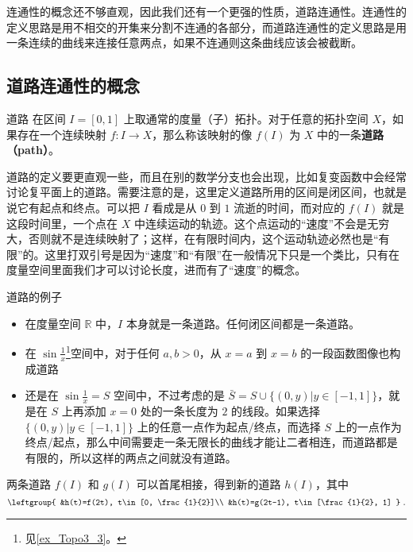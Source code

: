 
连通性的概念还不够直观，因此我们还有一个更强的性质，道路连通性。连通性的定义思路是用不相交的开集来分割不连通的各部分，而道路连通性的定义思路是用一条连续的曲线来连接任意两点，如果不连通则这条曲线应该会被截断。

\subsection{道路连通性的概念}
\begin{definition}{道路}\label{def_Topo4_1}
在区间 $I=[0,1]$ 上取通常的度量（子）拓扑。对于任意的拓扑空间 $X$，如果存在一个连续映射 $f: I\rightarrow X$，那么称该映射的像 $f(I)$ 为 $X$ 中的一条\textbf{道路（path）}。
\end{definition}

道路的定义要更直观一些，而且在别的数学分支也会出现，比如复变函数中会经常讨论复平面上的道路。需要注意的是，这里定义道路所用的区间是闭区间，也就是说它有起点和终点。可以把 $I$ 看成是从 $0$ 到 $1$ 流逝的时间，而对应的 $f(I)$ 就是这段时间里，一个点在 $X$ 中连续运动的轨迹。这个点运动的“速度”不会是无穷大，否则就不是连续映射了；这样，在有限时间内，这个运动轨迹必然也是“有限”的。这里打双引号是因为“速度”和“有限”在一般情况下只是一个类比，只有在度量空间里面我们才可以讨论长度，进而有了“速度”的概念。

\begin{example}{道路的例子}\label{ex_Topo4_1}
\begin{itemize}
\item 在度量空间 $\mathbb{R}$ 中，$I$ 本身就是一条道路。任何闭区间都是一条道路。
\item 在 $\sin{\frac{1}{x}}$\footnote{见\autoref{ex_Topo3_3}。}空间中，对于任何 $a, b>0$，从 $x=a$ 到 $x=b$ 的一段函数图像也构成道路
\item 还是在 $\sin{\frac{1}{x}}=S$ 空间中，不过考虑的是 $\bar{S}=S\cup\{(0, y)|y\in [-1,1]\}$，就是在 $S$ 上再添加 $x=0$ 处的一条长度为 $2$ 的线段。如果选择 $\{(0, y)|y\in [-1,1]\}$ 上的任意一点作为起点/终点，而选择 $S$ 上的一点作为终点/起点，那么中间需要走一条无限长的曲线才能让二者相连，而道路都是有限的，所以这样的两点之间就没有道路。

\end{itemize}
\end{example}

两条道路 $f(I)$ 和 $g(I)$ 可以首尾相接，得到新的道路 $h(I)$，其中
\begin{equation}
\leftgroup{
&h(t)=f(2t), t\in[0, \frac{1}{2}]\\
&h(t)=g(2t-1), t\in[\frac{1}{2}, 1]
}~.
\end{equation}


